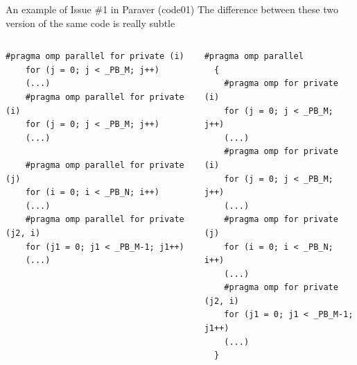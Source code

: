 \documentclass[10pt,xcolor=table]{beamer}
\begin{document}
\begin{frame}[fragile]{An example of Issue \#1 in Paraver (code01)}
The difference between these two version of the same code is really subtle
\begin{columns}
\begin{column}{0.57\textwidth}
\begin{lstlisting}[style=shell,basicstyle=\scriptsize\ttfamily,gobble=3,caption={Several parallel regions}]
     #pragma omp parallel for private (i)
    for (j = 0; j < _PB_M; j++)
    (...)
    #pragma omp parallel for private (i)
    for (j = 0; j < _PB_M; j++)
    (...)
    
    #pragma omp parallel for private (j)
    for (i = 0; i < _PB_N; i++)
    (...)
    #pragma omp parallel for private (j2, i)
    for (j1 = 0; j1 < _PB_M-1; j1++)
    (...)
  \end{lstlisting}
  \end{column}
\begin{column}{0.43\textwidth}
  \begin{lstlisting}[style=shell,gobble=3,basicstyle=\scriptsize\ttfamily,caption={One parallel region}]
   #pragma omp parallel
  {
    #pragma omp for private (i)
    for (j = 0; j < _PB_M; j++)
    (...)
    #pragma omp for private (i)
    for (j = 0; j < _PB_M; j++)
    (...)
    #pragma omp for private (j)
    for (i = 0; i < _PB_N; i++)
    (...)
    #pragma omp for private (j2, i)
    for (j1 = 0; j1 < _PB_M-1; j1++)
    (...)
  }
  \end{lstlisting}
  \end{column}
  \end{columns}
\end{frame}
\end{document}
